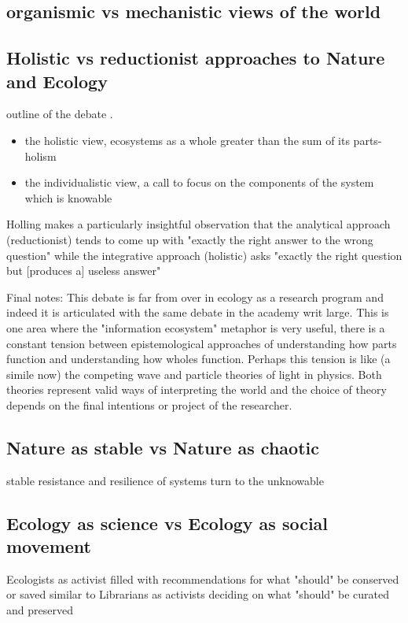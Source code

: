 \subsection{organismic vs mechanistic views of the world}

\cite{tansley_1935}

\subsection{Holistic vs reductionist approaches to Nature and Ecology}

outline of the debate \cite{holling_1998, worster_1977}. \begin{itemize} \item the holistic view, ecosystems as a whole greater than the sum of its parts-holism \cite{clements_1936} \item the individualistic view, a call to focus on the components of the system which is knowable \cite{gleason_1939} \end{itemize}

Holling makes a particularly insightful observation that the analytical approach (reductionist) tends to come up with "exactly the right answer to the wrong question" while the integrative approach (holistic) asks "exactly the right question but [produces a] useless answer" \cite[][p. 3]{holling_1998} 

Final notes: This debate is far from over in ecology as a research program and indeed it is articulated with the same debate in the academy writ large. This is one area where the "information ecosystem" metaphor is very useful, there is a constant tension between epistemological approaches of understanding how  parts function and understanding how wholes function. Perhaps this tension is like (a simile now) the competing wave and particle theories of light in physics. Both theories represent valid ways of interpreting the world and the choice of theory depends on the final intentions or project of the researcher.

\subsection{Nature as stable vs Nature as chaotic}

stable \cite{odum_1953} 
resistance and resilience of systems \cite{holling_1973}
turn to the unknowable\cite{barbour_1996}

\subsection{Ecology as science vs Ecology as social movement}

Ecologists as activist filled with recommendations for what "should" be conserved or saved similar to Librarians as activists deciding on what "should" be curated and preserved
